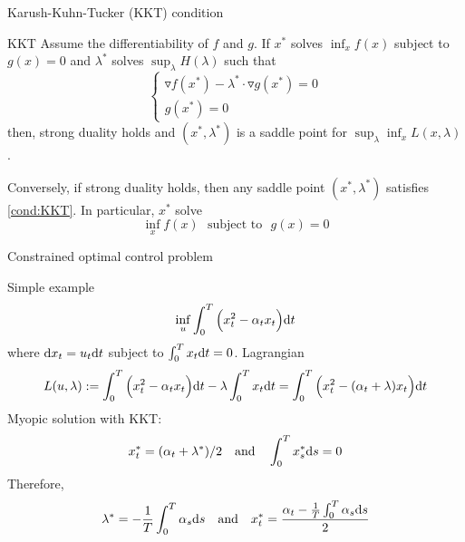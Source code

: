 \documentclass[color=usenames,dvipsnames]{beamer}
\newcommand{\dt}{\text{\normalfont d}t}
\newcommand{\ds}{\text{\normalfont d}s}
\newcommand{\dx}{\text{\normalfont d}x}
\begin{document}
\begin{frame}{Karush-Kuhn-Tucker (KKT) condition}
    \begin{block}
        {KKT}
        Assume the differentiability of $f$ and $g$.
    If $x^*$ solves $\inf_x f(x)$   subject to $g(x)=0$ and $\lambda^*$ solves $\sup_{\lambda}H(\lambda)$ such that 
    \begin{equation} \label{cond:KKT}
    \begin{cases} \triangledown f(x^*) - \lambda^* \cdot \triangledown g(x^*) = 0\\
            g (x^*)=0
        \end{cases}
    \end{equation}
    then, strong duality holds and $(x^*,\lambda^*)$ is a saddle point for $\sup_{\lambda}\inf_{x}L(x,\lambda)$. 

    Conversely, if strong duality holds, then any saddle point $(x^*,\lambda^*)$ satisfies \eqref{cond:KKT}. 
    In particular, $x^*$ solve 
    \[
        \inf_x f(x) ~~~ \textrm{subject to}~~~g(x)=0
    \]
    \end{block}
\end{frame}
\begin{frame}{Constrained optimal control problem}
\begin{block}
    {Simple example}
    \[
        \inf_{u}\int_0^T\Big(x_t^2 - \alpha_t x_t\Big) {{\dt}}
    \]
    where $\dx_t=u_t\dt$ subject to $\int_0^Tx_t\dt = 0$.
    Lagrangian
    \[
    L(u,\lambda):=\int_0^T\Big(x_t^2 - \alpha_t x_t\Big) {{\dt}}-\lambda\int_0^Tx_t\dt =  \int_0^T\Big(x_t^2 - (\alpha_t + \lambda) x_t\Big) {{\dt}}
    \]
    Myopic solution with KKT:
    \[
    x^*_t =   (\alpha_t + \lambda^* )/2~~\text{ and }~~\int_0^Tx^*_s\ds = 0
    \]
    Therefore,
    \[
    \lambda^*=-\frac1T\int_0^T\alpha_s\ds~~\text{ and }~~x^*_t =   \frac{\alpha_t - \frac{1}{T}\int_0^T\alpha_s{{\ds}}}{2}
    \]
\end{block}
    
\end{frame}
\end{document}
